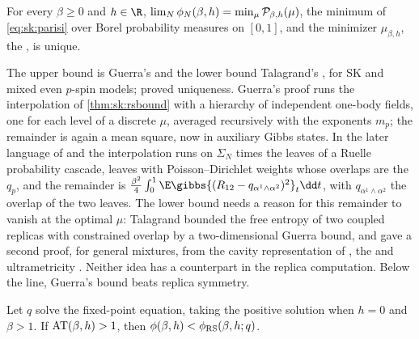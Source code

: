 \begin{refsection}
\begin{theorem}\label{thm:sk:parisi}
For every $\beta\ge0$ and $h\in\R$, $\lim_N\phi_N(\beta,h)=\min_\mu\mathcal{P}_{\beta,h}(\mu)$, the minimum of \eqref{eq:sk:parisi} over Borel probability measures on $[0,1]$, and the minimizer $\mu_{\beta,h}$, the , is unique.
\end{theorem}

The upper bound is Guerra's \parencite*[Thm.~3]{Guerra2003} and the lower bound Talagrand's \parencite*{Talagrand2006}, for SK and mixed even $p$-spin models; \textcite[Cor.~1]{AuffingerChen2015a} proved uniqueness. Guerra's proof runs the interpolation of \cref{thm:sk:rsbound} with a hierarchy of independent one-body fields, one for each level of a discrete $\mu$, averaged recursively with the exponents $m_p$; the remainder is again a mean square, now in auxiliary Gibbs states. In the later language of \textcite{AizenmanSimsStarr2003} and \textcite{Panchenko2013b} the interpolation runs on $\Sigma_N$ times the leaves of a Ruelle probability cascade, leaves with Poisson--Dirichlet weights whose overlaps are the $q_p$, and the remainder is $\frac{\beta^2}4\int_0^1\E\gibbs{(R_{12}-q_{\alpha^1\wedge\alpha^2})^2}_t\dd t$, with $q_{\alpha^1\wedge\alpha^2}$ the overlap of the two leaves. The lower bound needs a reason for this remainder to vanish at the optimal $\mu$: Talagrand bounded the free entropy of two coupled replicas with constrained overlap by a two-dimensional Guerra bound, and \textcite{Panchenko2014} gave a second proof, for general mixtures, from the cavity representation of \textcite{AizenmanSimsStarr2003}, the  \parencite{GhirlandaGuerra1998} and ultrametricity \parencite{Panchenko2013a}. Neither idea has a counterpart in the replica computation. Below the line, Guerra's bound beats replica symmetry.

\begin{theorem}[Toninelli]\label{thm:sk:toninelli}
Let $q$ solve the fixed-point equation, taking the positive solution when $h=0$ and $\beta>1$. If $\mathrm{AT}(\beta,h)>1$, then $\phi(\beta,h)<\phi_{\mathrm{RS}}(\beta,h;q)$.
\end{theorem}


\end{refsection}

